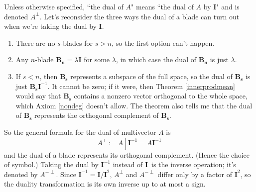 \documentclass{utarticle}
\newcommand{\bl}[1]{\ensuremath{\bm{#1}}}
\newcommand{\I}{\bl{I}}
\DeclareMathOperator{\lin}{\rfloor}
\newcommand{\dual}[1]{\ensuremath{#1^\perp}}
\newcommand{\invdual}[1]{\ensuremath{#1^{-\perp}}}
\begin{document}
Unless otherwise specified, ``the dual of $A$" means ``the dual of $A$ by \I" and is
denoted \dual{A}.  Let's reconsider the three ways the dual of a blade can turn out when we're 
taking the dual by \I.
\begin{enumerate}
\item There are no $s$-blades for $s > n$, so the first option can't happen.
\item Any $n$-blade $\bl{B_n} = \lambda \I$ for some $\lambda$, in which case 
          the dual of \bl{B_n} is just $\lambda$.
\item If $s < n$, then \bl{B_s} represents a subspace of the full space, so the dual of \bl{B_s} 
          is just $\bl{B_s}\I^{-1}$.   It cannot be zero; if it were, then Theorem \ref{innerprodmean}
          would say that \bl{B_s} contains a nonzero vector orthogonal to the whole space, which 
          Axiom \ref{nondeg} doesn't allow.  The theorem also tells me that the dual of \bl{B_s} 
          represents the orthogonal complement of \bl{B_s}.
\end{enumerate}
So the general formula for the dual of multivector $A$ is
\begin{equation} \dual{A} := A \lin \I^{-1} = A \I^{-1} \label{dualdef} \end{equation}
and the dual of a blade represents its orthogonal complement.  (Hence the choice of symbol.)
Taking the dual by $\I^{-1}$ instead of \I\ is the inverse operation; it's denoted by \invdual{A}.  
Since $\I^{-1} = \I / \I^2$, \dual{A} and \invdual{A} differ only by a factor of $\I^2$, so the duality 
transformation is its own inverse up to at most a sign.
\end{document}
